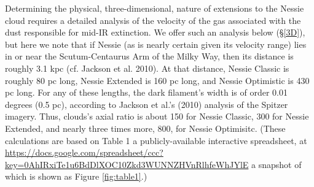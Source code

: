 Determining the physical, three-dimensional, nature of extensions to the
Nessie cloud requires a detailed analysis of the velocity of the gas
associated with the dust responsible for mid-IR extinction. We
offer such an analysis below (\S\ref{3D}), but here we note that
if Nessie (as is nearly certain given its velocity range) lies in or
near the Scutum-Centaurus Arm of the Milky Way, then its distance is
roughly 3.1 kpc (cf. Jackson et al. 2010). At that distance, Nessie
Classic is roughly 80 pc long, Nessie Extended is 160 pc long, and
Nessie Optimistic is 430 pc long. For any of these lengths, the dark filament's
width is of order 0.01 degrees (0.5 pc), according to Jackson et al.'s (2010) analysis of the Spitzer imagery. Thus, clouds's axial ratio is about
150 for Nessie Classic, 300 for Nessie Extended, and nearly three times
more, 800, for Nessie Optimisitc. (These calculations are based on Table 1 a publicly-available interactive spreadsheet, at
\url{https://docs.google.com/spreadsheet/ccc?key=0AhIRxiTe1u6BdDlXOC10Zkd3WUNNZHVnRlhfeWhJYlE} a snapshot of which is shown as Figure \ref{fig:table1}.)